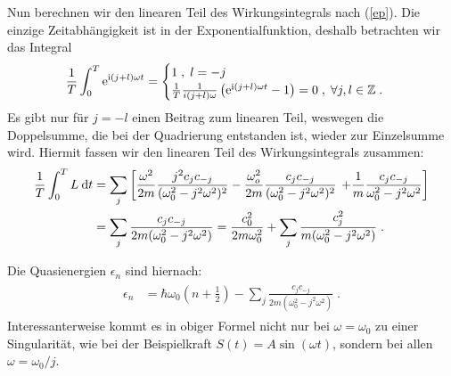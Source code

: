 \fi
       Nun berechnen wir den linearen Teil des Wirkungsintegrals nach (\ref{ep}).
       Die einzige Zeitabhängigkeit ist in der Exponentialfunktion, deshalb betrachten wir das Integral
       \begin{align}
         \frac{1}{T}\int_0^T\text e^{\text i(j+l)\omega t}=
         \begin{cases}
           1\;,\;l=-j\\
           \frac{1}{T}\frac{1}{i(j+l)\omega}\left(\text e^{\text i(j+l)\omega t}-1\right)=0\;,\; \forall j,l \in \mathbb{Z} \;.
         \end{cases}
       \end{align}
       Es gibt nur für $j=-l$ einen Beitrag zum linearen Teil, weswegen die Doppelsumme, die bei der Quadrierung entstanden ist, wieder zur Einzelsumme wird.
       Hiermit fassen wir den linearen Teil des Wirkungsintegrals zusammen:
       \begin{align}
         \begin{split}
           \frac{1}{T} \int_0^T L \: \text d t
           &= \sum_j \left[\frac{\omega^2}{2m} \frac{j^2c_jc_{-j}}{(\omega_0^2-j^2\omega^2)^2}
           - \frac{\omega_o^2}{2m} \frac{c_jc_{-j}}{(\omega_0^2-j^2\omega^2)^2} \right.
           \left. +\frac{1}{m} \frac{c_jc_{-j}}{\omega_0^2-j^2\omega^2}
           \right]\\
           &= \sum_j \frac{c_jc_{-j}}{2m(\omega_0^2-j^2\omega^2)} = \frac{c_0^2}{2m\omega_0^2} + \sum_{j} \frac{c_j^2}{m(\omega_0^2-j^2\omega^2)} \; .
         \end{split}
       \end{align}

       Die Quasienergien $\epsilon_n$ sind hiernach:
       \begin{align}
         \begin{split}
           \epsilon_n &= \hbar \omega_0\left(n+\frac{1}{2}\right) - \sum_j \frac{c_jc_{-j}}{2m(\omega_0^2-j^2\omega^2)} \; .
         \end{split}
       \end{align}
       Interessanterweise kommt es in obiger Formel nicht nur bei $\omega = \omega_0$ zu einer Singularität, wie bei der Beispielkraft $S(t) = A\sin(\omega t)$, sondern bei allen $\omega = \omega_0 / j$.



